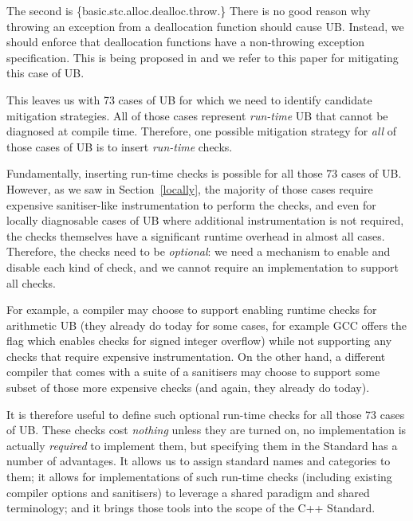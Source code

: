The second is \{basic.stc.alloc.dealloc.throw.\} There is no good reason why throwing an exception from a deallocation function should cause UB. Instead, we should enforce that deallocation functions have a non-throwing exception specification. This is being proposed in \cite{P3424R0} and we refer to this paper for mitigating this case of UB.

This leaves us with 73 cases of UB for which we need to identify candidate mitigation strategies. All of those cases represent \emph{run-time} UB that cannot be diagnosed at compile time. Therefore, one possible mitigation strategy for \emph{all} of those cases of UB is to insert \emph{run-time} checks.

Fundamentally, inserting run-time checks is possible for all those 73 cases of UB. However, as we saw in Section~\ref{locally}, the majority of those cases require expensive sanitiser-like instrumentation to perform the checks, and even for locally diagnosable cases of UB where additional instrumentation is not required, the checks themselves have a significant runtime overhead in almost all cases. Therefore, the checks need to be \emph{optional}: we need a mechanism to enable and disable each kind of check, and we cannot require an implementation to support all checks.

For example, a compiler may choose to support enabling runtime checks for arithmetic UB (they already do today for some cases, for example GCC offers the  flag which enables checks for signed integer overflow) while not supporting any checks that require expensive instrumentation. On the other hand, a different compiler that comes with a suite of a sanitisers may choose to support some subset of those more expensive checks (and again, they already do today).

It is therefore useful to define such optional run-time checks for all those 73 cases of UB. These checks cost \emph{nothing} unless they are turned on, no implementation is actually \emph{required} to implement them, but specifying them in the Standard has a number of advantages. It allows us to assign standard names and categories to them; it allows for implementations of such run-time checks (including existing compiler options and sanitisers) to leverage a shared paradigm and shared terminology; and it brings those tools into the scope of the C++ Standard. %

